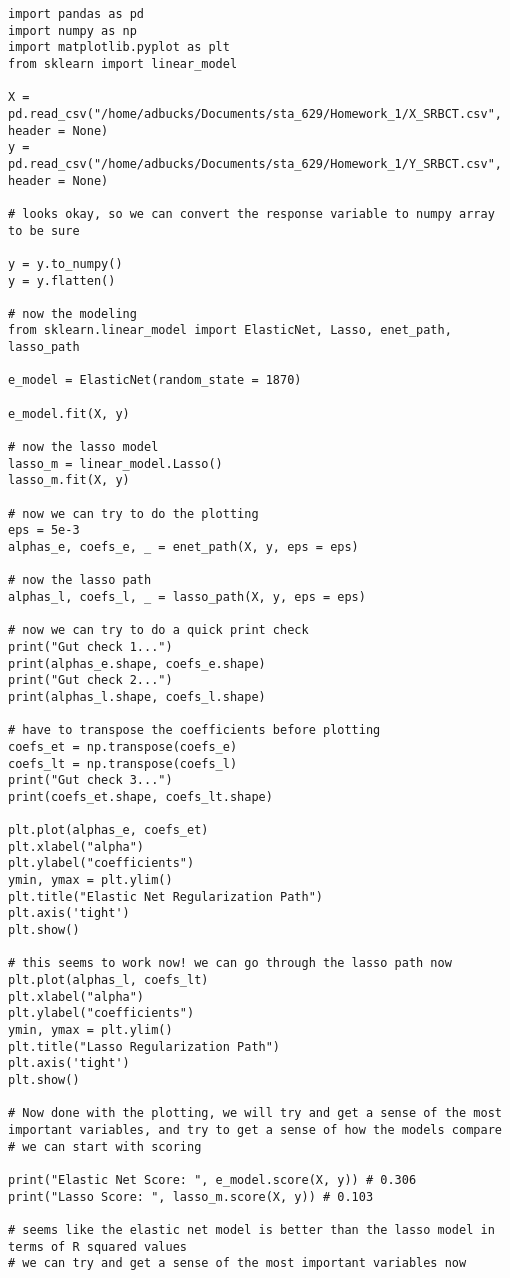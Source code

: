 \documentclass[12pt, letterpaper]{article}
\begin{document}
\begin{verbatim} 
import pandas as pd 
import numpy as np 
import matplotlib.pyplot as plt 
from sklearn import linear_model 

X = pd.read_csv("/home/adbucks/Documents/sta_629/Homework_1/X_SRBCT.csv", header = None)
y = pd.read_csv("/home/adbucks/Documents/sta_629/Homework_1/Y_SRBCT.csv", header = None)

# looks okay, so we can convert the response variable to numpy array to be sure 

y = y.to_numpy() 
y = y.flatten()

# now the modeling 
from sklearn.linear_model import ElasticNet, Lasso, enet_path, lasso_path 

e_model = ElasticNet(random_state = 1870)

e_model.fit(X, y)

# now the lasso model 
lasso_m = linear_model.Lasso()
lasso_m.fit(X, y)

# now we can try to do the plotting 
eps = 5e-3  
alphas_e, coefs_e, _ = enet_path(X, y, eps = eps) 

# now the lasso path 
alphas_l, coefs_l, _ = lasso_path(X, y, eps = eps)

# now we can try to do a quick print check 
print("Gut check 1...") 
print(alphas_e.shape, coefs_e.shape)
print("Gut check 2...")
print(alphas_l.shape, coefs_l.shape)

# have to transpose the coefficients before plotting 
coefs_et = np.transpose(coefs_e)
coefs_lt = np.transpose(coefs_l)
print("Gut check 3...")
print(coefs_et.shape, coefs_lt.shape) 

plt.plot(alphas_e, coefs_et)
plt.xlabel("alpha") 
plt.ylabel("coefficients") 
ymin, ymax = plt.ylim()
plt.title("Elastic Net Regularization Path") 
plt.axis('tight')
plt.show() 

# this seems to work now! we can go through the lasso path now 
plt.plot(alphas_l, coefs_lt)
plt.xlabel("alpha")
plt.ylabel("coefficients")
ymin, ymax = plt.ylim() 
plt.title("Lasso Regularization Path") 
plt.axis('tight') 
plt.show() 

# Now done with the plotting, we will try and get a sense of the most important variables, and try to get a sense of how the models compare 
# we can start with scoring 

print("Elastic Net Score: ", e_model.score(X, y)) # 0.306
print("Lasso Score: ", lasso_m.score(X, y)) # 0.103 

# seems like the elastic net model is better than the lasso model in terms of R squared values 
# we can try and get a sense of the most important variables now 


\end{verbatim}
\end{document}
